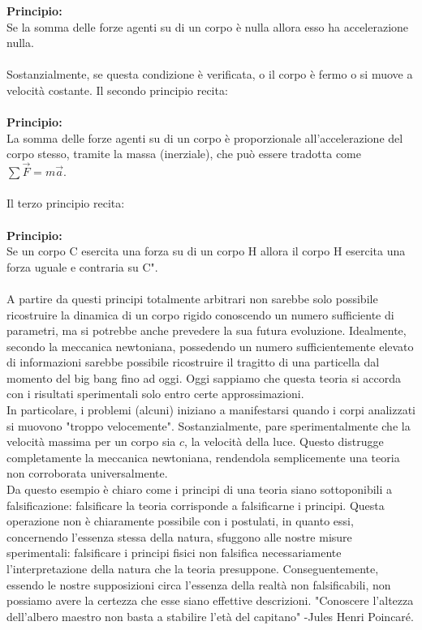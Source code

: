 \documentclass[]{article}
\begin{document}
	\textbf{Principio:}\\
	Se la somma delle forze agenti su di un corpo è nulla allora esso ha accelerazione nulla.
	\\\\ 
	Sostanzialmente, se questa condizione è verificata, o il corpo è fermo o si muove a velocità costante. Il secondo principio recita:
	\\\\
	\textbf{Principio:}\\
	La somma delle forze agenti su di un corpo è proporzionale all'accelerazione del corpo stesso, tramite la massa (inerziale), che può essere tradotta come $\sum\vec{F}=m\vec{a}$.
	\\\\
	Il terzo principio recita: \\\\
	\textbf{Principio:}\\
	Se un corpo C esercita una forza su di un corpo H allora il corpo H esercita una forza uguale e contraria su C".
	\\\\
	A partire da questi principi totalmente arbitrari non sarebbe solo possibile ricostruire la dinamica di un corpo rigido conoscendo un numero sufficiente di parametri, ma si potrebbe anche prevedere la sua futura evoluzione. Idealmente, secondo la meccanica newtoniana, possedendo un numero sufficientemente elevato di informazioni sarebbe possibile ricostruire il tragitto di una particella dal momento del big bang fino ad oggi. Oggi sappiamo che questa teoria si accorda con i risultati sperimentali solo entro certe approssimazioni.\\
	In particolare, i problemi (alcuni) iniziano a manifestarsi quando i corpi analizzati si muovono "troppo velocemente". Sostanzialmente, pare sperimentalmente che la velocità massima per un corpo sia $c$, la velocità della luce. Questo distrugge completamente la meccanica newtoniana, rendendola semplicemente una teoria non corroborata universalmente.\\
	Da questo esempio è chiaro come i principi di una teoria siano sottoponibili a falsificazione: falsificare la teoria corrisponde a falsificarne i principi. Questa operazione non è chiaramente possibile con i postulati, in quanto essi, concernendo l'essenza stessa della natura, sfuggono alle nostre misure sperimentali: falsificare i principi fisici non falsifica necessariamente l'interpretazione della natura che la teoria presuppone. Conseguentemente, essendo le nostre supposizioni circa l'essenza della realtà non falsificabili, non possiamo avere la certezza che esse siano effettive descrizioni. "Conoscere l'altezza dell'albero maestro non basta a stabilire l'età del capitano" -Jules Henri Poincaré.  
\end{document}
